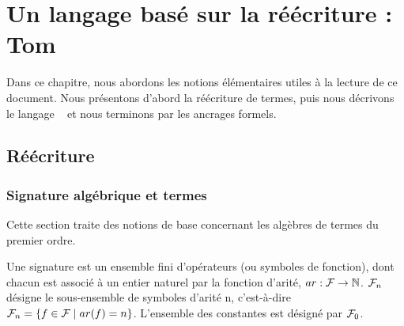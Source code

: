 \chapter{Un langage basé sur la réécriture : Tom}
\label{ch:tom}

\index{\tom|(}

Dans ce chapitre, nous abordons les notions élémentaires utiles à la lecture de
ce document. Nous présentons d'abord la réécriture de termes, puis nous
décrivons le langage {\tom}~\cite{Moreau2003,Balland2007} et nous terminons par
les ancrages formels. 



\section{Réécriture}

\subsection{Signature algébrique et termes}

Cette section traite des notions de base concernant les algèbres de termes du
premier ordre.

\begin{definition}[Signature]
Une signature \caF est un ensemble fini d'opérateurs (ou symboles de fonction),
dont chacun est associé à un entier naturel par la fonction d'arité, $ar : \mathcal{F}
\rightarrow \mathbb{N}$. $\mathcal{F}_n$ désigne le sous-ensemble de symboles d'arité n,
c'est-à-dire $\mathcal{F}_n = \{ f \in \mathcal{F} \mid ar(f) = n\}$.
L'ensemble des constantes est désigné par $\mathcal{F}_0$.
\end{definition}


